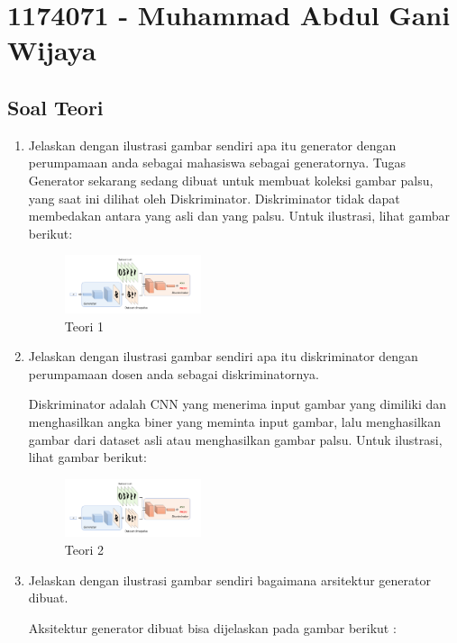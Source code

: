 \section{1174071 - Muhammad Abdul Gani Wijaya}
\subsection{Soal Teori}
\begin{enumerate}

	\item Jelaskan dengan ilustrasi gambar sendiri apa itu generator dengan perumpamaan anda sebagai mahasiswa sebagai generatornya.
	\hfill\break
	Tugas Generator sekarang sedang dibuat untuk membuat koleksi gambar palsu, yang saat ini dilihat oleh Diskriminator. Diskriminator tidak dapat membedakan antara yang asli dan yang palsu. Untuk ilustrasi, lihat gambar berikut: 

	\begin{figure}[H]
	\centering
		\includegraphics[width=4cm]{figures/1174071/8/1.PNG}
		\caption{Teori 1}
	\end{figure}

	\item Jelaskan dengan ilustrasi gambar sendiri apa itu diskriminator dengan perumpamaan dosen anda sebagai diskriminatornya.

	\hfill\break
	Diskriminator adalah CNN yang menerima input gambar yang dimiliki dan menghasilkan angka biner yang meminta input gambar, lalu menghasilkan gambar dari dataset asli atau menghasilkan gambar palsu. Untuk ilustrasi, lihat gambar berikut: 

	\begin{figure}[H]
	\centering
		\includegraphics[width=4cm]{figures/1174071/8/1.PNG}
		\caption{Teori 2}
	\end{figure}
	
	\item Jelaskan dengan ilustrasi gambar sendiri bagaimana arsitektur generator dibuat.

	\hfill\break
	Aksitektur generator dibuat bisa dijelaskan pada gambar berikut : 


\end{enumerate}
